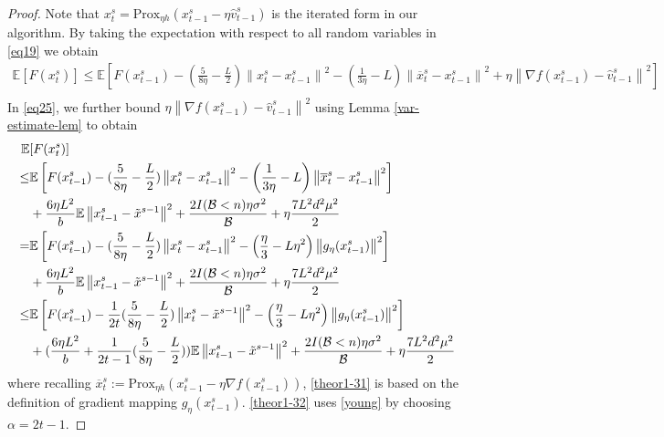 \documentclass[iicol,sn-basic]{sn-jnl}
\theoremstyle{thmstyleone}%
\theoremstyle{thmstyletwo}%
\theoremstyle{thmstylethree}%
\newcommand*{\Po}{\text{Prox}}
\newcommand*{\E}{\mathbb{E}}
\newcommand{\norm}[1]{\left\lVert#1\right\rVert}
\begin{document}
\begin{proof}
Note that $x_t^s = \Po_{\eta h}(x_{t-1}^s - \eta \hat{v}_{t-1}^s)$ is the iterated form in our algorithm.  By taking the expectation with respect to all random variables in \eqref{eq19} we obtain
 \begin{equation}\label{eq25}
 \begin{split} 
\E[F({x}_{t}^s)] \leq \E\left[F({x}_{t-1}^s)  -(\frac{5}{8\eta} - \frac{L}{2})\norm{{x}_t^s-x_{t-1}^s}^2- \left(\frac{1}{3\eta}-L\right)\norm{\overline{x}_t^s-x_{t-1}^s}^2+\eta \norm{\nabla f(x_{t-1}^s)-\hat{v}_{t-1}^s}^2\right]\\
 \end{split}
 \end{equation}
In \eqref{eq25}, we further bound $\eta \norm{\nabla f(x_{t-1}^s)-\hat{v}_{t-1}^s}^2$ using Lemma \ref{var-estimate-lem} to obtain
 \begin{align} 
\E&[F({x}_{t}^s)] \notag
\notag
\\ \leq& \E\left[F({x}_{t-1}^s)  -(\frac{5}{8\eta} - \frac{L}{2})\norm{{x}_t^s-x_{t-1}^s}^2- \left(\frac{1}{3\eta}-L\right)\norm{\overline{x}_t^s-x_{t-1}^s}^2\right]\notag\\
&+ \frac{6\eta L^2}{b}\E\norm{x_{t-1}^s-\tilde{x}^{s-1}}^2 + \frac{2I(\mathcal{B} < n)\eta \sigma ^2}{\mathcal{B}}+\eta \frac{7 L^2 d^2 \mu^2}{2}\notag
\\ =& \E\left[F({x}_{t-1}^s)  -(\frac{5}{8\eta} - \frac{L}{2})\norm{{x}_t^s-x_{t-1}^s}^2- \left(\frac{\eta}{3}-L\eta^2\right)\norm{g_{\eta}(x_{t-1}^s)}^2\right]\notag
\\&+\frac{6\eta L^2}{b}\E\norm{x_{t-1}^s-\tilde{x}^{s-1}}^2+ \frac{2I(\mathcal{B} < n)\eta \sigma ^2}{\mathcal{B}}+\eta \frac{7L^2 d^2 \mu^2}{2}\label{theor1-31}
\\ \leq& \E\left[F({x}_{t-1}^s)  -\frac{1}{2t}(\frac{5}{8\eta} - \frac{L}{2})\norm{{x}_t^s-\tilde{x}^{s-1}}^2- \left(\frac{\eta}{3}-L\eta^2\right)\norm{g_{\eta}(x_{t-1}^s)}^2\right]\notag\\
&+(\frac{6\eta L^2}{b}+\frac{1}{2t-1}(\frac{5}{8\eta} - \frac{L}{2}))\E\norm{x_{t-1}^s-\tilde{x}^{s-1}}^2
+ \frac{2I(\mathcal{B} < n)\eta \sigma ^2}{\mathcal{B}}+\eta \frac{7 L^2 d^2 \mu^2}{2}\label{theor1-32}
 \end{align}
where recalling $\overline{x}_t^s := \Po_{\eta h}(x_{t-1}^s - \eta \nabla f(x_{t-1}^s))$, \eqref{theor1-31}  is based on the definition of gradient mapping $g_{\eta}(x_{t-1}^s)$. \eqref{theor1-32} uses \eqref{young} by choosing $\alpha = 2t-1$.
 

\end{proof}
\end{document}
